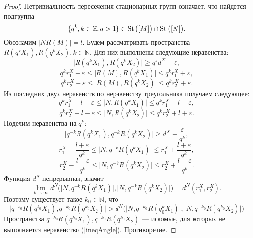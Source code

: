 \begin{proof}
  Нетривиальность пересечения стационарных групп означает, что
  найдется подгруппа \[
    \{q^k, k\in \mathbb{Z}, q> 1\} \in \operatorname{St}\big([M]\big) \cap \operatorname{St} \big([N]\big).
  \]
  Обозначим \( |N R(M)| = l \). Будем рассматривать пространства \(
  R(q^k X_1), R(q^k X_2), k \in \mathbb{N} \). Для них выполнены
  следующие неравенства:
  \[
    \big| R(q^k X_1), R(q^k X_2) \big| \ge q^k d^X - \varepsilon,
  \]
  \[
    q^k r_1^X - \varepsilon  \le\big | R(M), R(q^k X_1) \big| \le q^k
    r_1^X + \varepsilon ,
  \]
  \[
    q^k r_2^X - \varepsilon  \le\big | R(M), R(q^k X_2) \big| \le q^k
    r_2^X + \varepsilon .
  \]
  Из последних двух неравенств по неравенству треугольника получаем следующее:
  \[
    q^k r_1^X - l - \varepsilon \le \big|N, R(q^k X_1) \big| \le q^k
    r_1^X + l + \varepsilon,
  \]
  \[
    q^k r_2^X - l - \varepsilon \le \big|N, R(q^k X_2) \big| \le q^k
    r_2^X + l + \varepsilon.
  \]
  Поделим неравенства на \( q^k \):
  \[
    \big| q^{-k}R(q^k X_1), q^{-k}R(q^k X_2) \big| \ge d^X -
    \frac{\varepsilon }{q^k},
  \]
  \[
    r_1^X - \frac{l + \varepsilon}{q^k} \le \big|N, q^{-k}R(q^k X_1)
    \big| \le
    r_1^X + \frac{l + \varepsilon}{q^k},
  \]
  \[
    r_2^X - \frac{l + \varepsilon}{q^k} \le \big|N, q^{-k}R(q^k X_2)
    \big| \le
    r_2^X + \frac{l + \varepsilon}{q^k}.
  \]
  Функция \( d^N \) непрерывная, значит
  \[
    \lim_{k \rightarrow \infty
    }d^N\Big(\big|N, q^{-k}R(q^k X_1)
      \big|, \big|N, q^{-k}R(q^k X_2)
    \big|\Big) = d^N(r_1^X, r_2^X).
  \]
  Поэтому существует такое \( k_0 \in \mathbb{N} \), что
  \[
    \big| q^{-k_0}R(q^{k_0} X_1), q^{-k_0}R(q^{k_0} X_2) \big| >
    d^N\Big(\big|N, q^{-k_0}R(q^k_0 X_1)
      \big|, \big|N, q^{-k_0}R(q^{k_0} X_2)
    \big|\Big)
  \]
  Пространства \( q^{-k_0}R(q^{k_0}X_1), q^{-k_0}R(q^{k_0}X_2)\) ---
  искомые, для которых не выполняется неравенство (\ref{ineqAngle}).
  Противоречие.
\end{proof}
